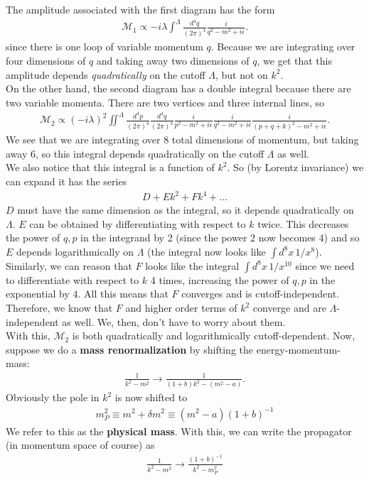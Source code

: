 \documentclass{book}
\theoremstyle{definition}
\newcommand{\f}[2]{\frac{#1}{#2}}
\begin{document}
The amplitude associated with the first diagram has the form
\begin{align}
\mathcal{M}_1 \propto -i\lambda \int^\Lambda \f{d^4q}{(2\pi)^4}  \f{i}{q^2 - m^2 + i\epsilon}.
\end{align}
since there is one loop of variable momentum $q$. Because we are integrating over four dimensions of $q$ and taking away two dimensions of $q$, we get that this amplitude depends \textit{quadratically} on the cutoff $\Lambda$, but not on $k^2$. \\

On the other hand, the second diagram has a double integral because there are two variable momenta. There are two vertices and three internal lines, so
\begin{align}
\mathcal{M}_2 \propto (-i\lambda)^2 \iint^\Lambda \f{d^4p}{(2\pi)^4}\f{d^4q}{(2\pi)^4} \f{i}{p^2 - m^2 + i\epsilon} \f{i}{q^2 - m^2  + i\epsilon} \f{i}{(p+q+k)^2 - m^2  + i\epsilon}.
\end{align}
We see that we are integrating over 8 total dimensions of momentum, but taking away 6, so this integral depends quadratically on the cutoff $\Lambda$ as well. \\

We also notice that this integral is a function of $k^2$. So (by Lorentz invariance) we can expand it has the series
\begin{align}
D + Ek^2 + Fk^4 + \dots
\end{align}
$D$ must have the same dimension as the integral, so it depends quadratically on $\Lambda$. $E$ can be obtained by differentiating with respect to $k$ twice. This decreases the power of $q,p$ in the integrand by 2 (since the power 2 now becomes 4) and so $E$ depends logarithmically on $\Lambda$ (the integral now looks like $\int d^8x\,1/x^8$). Similarly, we can reason that $F$ looks like the integral $\int d^8x\,1/x^10$ since we need to differentiate with respect to $k$ 4 times, increasing the power of $q,p$ in the exponential by $4$. All this means that $F$ converges and is cutoff-independent. Therefore, we know that $F$ and higher order terms of $k^2$ converge and are $\Lambda$-independent as well. We, then, don't have to worry about them.\\

With this, $\mathcal{M}_2$ is both quadratically and logarithmically cutoff-dependent. Now, suppose we do a \textbf{mass renormalization} by shifting the energy-momentum-mass:
\begin{align}
\f{1}{k^2 - m^2} \to \f{1}{(1+b)k^2 - (m^2 - a)}.
\end{align} 
Obviously the pole in $k^2$ is now shifted to 
\begin{align}
\boxed{m^2_P \equiv m^2 + \delta m^2 \equiv (m^2 - a)(1+b)^{-1}}
\end{align}
We refer to this as the \textbf{physical mass}. With this, we can write the propagator (in momentum space of course) as
\begin{align}
\boxed{\f{1}{k^2 - m^2} \to \f{(1+b)^{-1}}{k^2 - m^2_P}}
\end{align}
\end{document}
